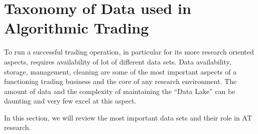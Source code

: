 \section{Taxonomy of Data used in Algorithmic Trading }

To run a successful trading operation, in particular for its more research oriented aspects, requires availability of lot of different data sets. Data availability, storage, management, cleaning are some of the most important aspects of a functioning trading business and the core of any research environment. The amount of data and the complexity of maintaining the ``Data Lake'' can be daunting and very few  excel at this aspect.


In this section, we will review the most important data sets and their role in AT research.

